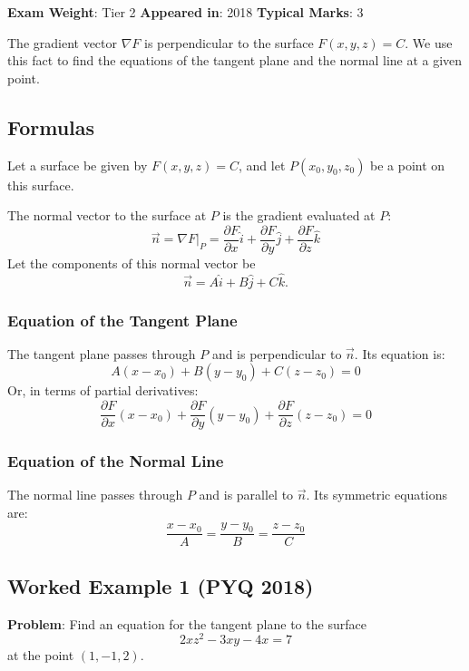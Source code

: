 \documentclass[
]{article}
\renewenvironment{quote}
  {\begin{tcolorbox}[
     colback=calloutbg,
     colframe=calloutframe,
     colupper=callouttext,
     arc=3pt,
     boxrule=0.5pt,
     leftrule=0.5pt,
     borderline west={3pt}{0pt}{calloutaccent},
     left=8pt,
     right=8pt,
     top=6pt,
     bottom=6pt
   ]}
  {\end{tcolorbox}}
\begin{document}
\begin{quote}
\textbf{Exam Weight}: Tier 2 \textbar{} \textbf{Appeared in}: 2018
\textbar{} \textbf{Typical Marks}: 3
\end{quote}

The gradient vector \(\nabla F\) is perpendicular to the surface
\(F(x, y, z) = C\). We use this fact to find the equations of the
tangent plane and the normal line at a given point.

\subsection{Formulas}\label{formulas}

Let a surface be given by \(F(x, y, z) = C\), and let
\(P(x_0, y_0, z_0)\) be a point on this surface.

The normal vector to the surface at \(P\) is the gradient evaluated at
\(P\):
\[
\vec{n} = \nabla F|_P = \frac{\partial F}{\partial x}\hat{i} + \frac{\partial F}{\partial y}\hat{j} + \frac{\partial F}{\partial z}\hat{k}
\]
Let the components of this normal vector be
\[
\vec{n} = A\hat{i} + B\hat{j} + C\hat{k}.
\]
\subsubsection{Equation of the Tangent
Plane}\label{equation-of-the-tangent-plane}

The tangent plane passes through \(P\) and is perpendicular to
\(\vec{n}\). Its equation is:
\[
A(x - x_0) + B(y - y_0) + C(z - z_0) = 0
\]
Or, in terms of partial derivatives:
\[
\frac{\partial F}{\partial x}(x - x_0) + \frac{\partial F}{\partial y}(y - y_0) + \frac{\partial F}{\partial z}(z - z_0) = 0
\]
\subsubsection{Equation of the Normal
Line}\label{equation-of-the-normal-line}

The normal line passes through \(P\) and is parallel to \(\vec{n}\). Its
symmetric equations are:
\[
\frac{x - x_0}{A} = \frac{y - y_0}{B} = \frac{z - z_0}{C}
\]

\subsection{Worked Example 1 (PYQ
2018)}\label{worked-example-1-pyq-2018-1}

\textbf{Problem}: Find an equation for the tangent plane to the surface
\[
2xz^2 - 3xy - 4x = 7
\]
at the point \((1, -1, 2)\).
\end{document}
